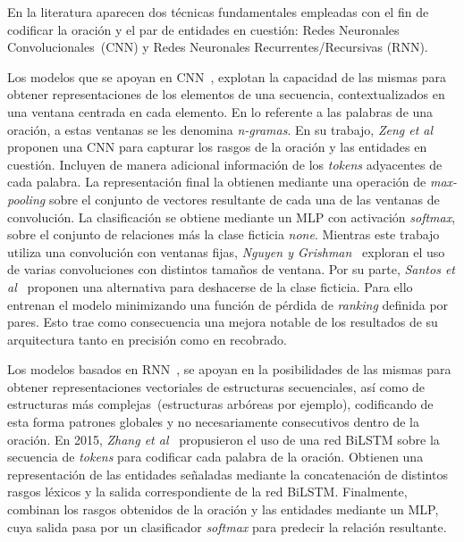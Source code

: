 En la literatura aparecen dos técnicas fundamentales empleadas con el fin de codificar la oración y el par de entidades en cuestión: Redes Neuronales Convolucionales~(CNN) y Redes Neuronales Recurrentes/Recursivas (RNN).

Los modelos que se apoyan en CNN~\cite{zeng2014relation, santos2015classifying, nguyen2015relation, xu2015semantic, huang2016attention, wang2016relation}, explotan la capacidad de las mismas para obtener representaciones de los elementos de una secuencia, contextualizados en una ventana centrada en cada elemento. En lo referente a las palabras de una oración, a estas ventanas se les denomina \textit{n-gramas}.
En su trabajo, \textit{Zeng et al}~\cite{zeng2014relation} proponen una CNN para capturar los rasgos de la oración y las entidades en cuestión.
Incluyen de manera adicional información de los \textit{tokens} adyacentes de cada palabra.
La representación final la obtienen mediante una operación de \textit{max-pooling} sobre el conjunto de vectores resultante de cada una de las ventanas de convolución.
La clasificación se obtiene mediante un MLP con activación \textit{softmax}, sobre el conjunto de relaciones más la clase ficticia \textit{none}.
Mientras este trabajo utiliza una convolución con ventanas fijas, \textit{Nguyen y Grishman}~\cite{nguyen2015relation} exploran el uso de varias convoluciones con distintos tamaños de ventana.
Por su parte, \textit{Santos et al}~\cite{santos2015classifying} proponen una alternativa para deshacerse de la clase ficticia.
Para ello entrenan el modelo minimizando una función de pérdida de \textit{ranking} definida por pares.
Esto trae como consecuencia una mejora notable de los resultados de su arquitectura tanto en precisión como en recobrado.

Los modelos basados en RNN~\cite{socher2012semantic, xu2015classifying, zhang2015bidirectional, ebrahimi2015chain, xiao2016semantic, lee2019semantic}, se apoyan en la posibilidades de las mismas para obtener representaciones vectoriales de estructuras secuenciales, así como de estructuras más complejas~(estructuras arbóreas por ejemplo), codificando de esta forma patrones globales y no necesariamente consecutivos dentro de la oración.
En 2015, \textit{Zhang et al}~\cite{zhang2015bidirectional} propusieron el uso de una red BiLSTM sobre la secuencia de \textit{tokens} para codificar cada palabra de la oración.
Obtienen una representación de las entidades señaladas mediante la concatenación de distintos rasgos léxicos y la salida correspondiente de la red BiLSTM.
Finalmente, combinan los rasgos obtenidos de la oración y las entidades mediante un MLP, cuya salida pasa por un clasificador \textit{softmax} para predecir la relación resultante.

